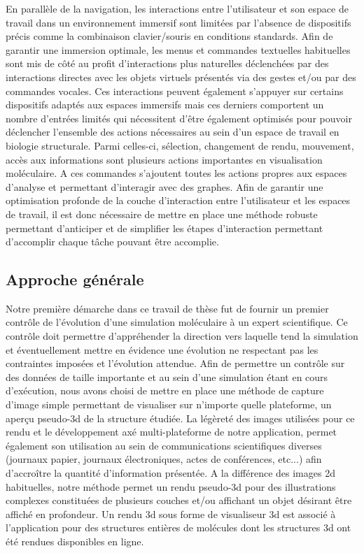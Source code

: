 En parallèle de la navigation, les interactions entre l'utilisateur et son espace de travail dans un environnement immersif sont limitées par l'absence de dispositifs précis comme la combinaison clavier/souris en conditions standards. Afin de garantir une immersion optimale, les menus et commandes textuelles habituelles sont mis de côté au profit d'interactions plus naturelles déclenchées par des interactions directes avec les objets virtuels présentés via des gestes et/ou par des commandes vocales. Ces interactions peuvent également s'appuyer sur certains dispositifs adaptés aux espaces immersifs mais ces derniers comportent un nombre d'entrées limités qui nécessitent d'être également optimisés pour pouvoir déclencher l'ensemble des actions nécessaires au sein d'un espace de travail en biologie structurale. Parmi celles-ci, sélection, changement de rendu, mouvement, accès aux informations sont plusieurs actions importantes en visualisation moléculaire. A ces commandes s'ajoutent toutes les actions propres aux espaces d'analyse et permettant d'interagir avec des graphes. Afin de garantir une optimisation profonde de la couche d'interaction entre l'utilisateur et les espaces de travail, il est donc nécessaire de mettre en place une méthode robuste permettant d'anticiper et de simplifier les étapes d'interaction permettant d'accomplir chaque tâche pouvant être accomplie.

 
\subsection*{Approche générale}

Notre première démarche dans ce travail de thèse fut de fournir un premier contrôle de l'évolution d'une simulation moléculaire à un expert scientifique. Ce contrôle doit permettre d'appréhender la direction vers laquelle tend la simulation et éventuellement mettre en évidence une évolution ne respectant pas les contraintes imposées et l'évolution attendue. Afin de permettre un contrôle sur des données de taille importante et au sein d'une simulation étant en cours d’exécution, nous avons choisi de mettre en place une méthode de capture d'image simple permettant de visualiser sur n'importe quelle plateforme, un aperçu pseudo-3d de la structure étudiée. La légèreté des images utilisées pour ce rendu et le développement axé multi-plateforme de notre application, permet également son utilisation au sein de communications scientifiques diverses (journaux papier, journaux électroniques, actes de conférences, etc...) afin d’accroître la quantité d'information présentée. A la différence des images 2d habituelles, notre méthode permet un rendu pseudo-3d pour des illustrations complexes constituées de plusieurs couches et/ou affichant un objet désirant être affiché en profondeur. Un rendu 3d sous forme de visualiseur 3d est associé à l'application pour des structures entières de molécules dont les structures 3d ont été rendues disponibles en ligne.

